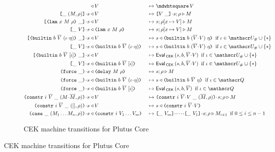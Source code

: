\begin{figure}[H]
\begin{subfigure}[c]{\linewidth}
\begin{minipage}{\linewidth}
\begin{alignat*}{2}
[] & \return V                                    &~\mapsto~& \cekhalt{V}\\
\inAppLeftFrame{(M,\rho)}  \cons s            & \return V  &~\mapsto~& \inAppRightFrame{V} \cons s;\rho \compute M\\
\inAppRightFrame{\VLamAbs{x}{M}{\rho}} \cons s   & \return V  &~\mapsto~& s;\rho[x \mapsto V] \compute M\\
\inAppLeftFrame{V} \cons s   & \return \VLamAbs{x}{M}{\rho}  &~\mapsto~& s;\rho[x \mapsto V] \compute M\\
\inAppRightFrame{\VBuiltin{b}{\repetition{V}}{(\iota \cons \eta)}} \cons s & \return V &~\mapsto~&
                         s \return \VBuiltin{b}{(\repetition{V} \snoc V)}{\eta} \enskip \text{if $\iota \in \Unihash \cup \VarStar$}\\
\inAppLeftFrame{V} \cons s & \return \VBuiltin{b}{\repetition{V}}{(\iota \cons \eta)} &~\mapsto~&
                         s \return \VBuiltin{b}{(\repetition{V} \snoc V)}{\eta} \enskip \text{if $\iota \in \Unihash \cup \VarStar$}\\
\inAppRightFrame{\VBuiltin{b}{\repetition{V}}{[\iota]}} \cons s  & \return V &~\mapsto~&
                         \EvalCEK\,(s, b, \repetition{V}\snoc V) \enskip \text{if $\iota \in \Unihash \cup \VarStar$}\\
\inAppLeftFrame{V} \cons s & \return \VBuiltin{b}{\repetition{V}}{[\iota]} &~\mapsto~&
                         \EvalCEK\,(s, b, \repetition{V}\snoc V) \enskip \text{if $\iota \in \Unihash \cup \VarStar$}\\
\inForceFrame{} \cons s & \return \VDelay{M}{\rho}         &~\mapsto~& s;\rho \compute M\\
\inForceFrame{} \cons s & \return \VBuiltin{b}{\repetition{V}}{(\iota \cons \eta)} &~\mapsto~&
                         s \return \VBuiltin{b}{\repetition{V}}{\eta} \enskip \text{if $\iota \in \QVar$}\\
\inForceFrame{} \cons s & \return \VBuiltin{b}{\repetition{V}}{[\iota]}   &~\mapsto~&
                         \EvalCEK\,(s, b, \repetition{V}) \enskip \text{if $\iota \in \QVar$}\\
\inConstrFrame{i}{\repetition{V}}{(M \cons \repetition{M}, \rho)} \cons s & \return V   &~\mapsto~&
                         \inConstrFrame{i}{\repetition{V} \cons V}{(\repetition{M}, \rho)} \cons s;\rho \compute M \\
\inConstrFrame{i}{\repetition{V}}{([], \rho)} \cons s & \return V   &~\mapsto~&
                         s \return \VConstr{i}{\repetition{V} \cons V} \\
\inCaseFrame{(M_1 \ldots M_n, \rho)} \cons s & \return \VConstr{i}{V_1 \ldots V_m}   &~\mapsto~&
                         \inAppLeftFrame{V_m} \cons \cdots \cons \inAppLeftFrame{V_1} \cons s ;\rho \compute M_{i+1} \enskip \text{if $0 \leq i \leq n-1$}
\end{alignat*}
\end{minipage}
    \caption{CEK machine transitions for Plutus Core}
    \label{fig:untyped-cek-transitions}
\end{subfigure}


\end{figure}
